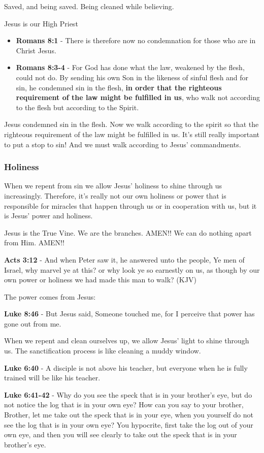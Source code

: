 \documentclass[11pt]{article}
\begin{document}
Saved, and being saved. Being cleaned while believing.

Jesus is our High Priest
\begin{itemize}
\item \textbf{Romans 8:1} - There is therefore now no condemnation for those who are in Christ Jesus.
\item \textbf{Romans 8:3-4} - For God has done what the law, weakened by the flesh, could not do. By sending his own Son in the likeness of sinful flesh and for sin, he condemned sin in the flesh, \textbf{in order that the righteous requirement of the law might be fulfilled in us}, who walk not according to the flesh but according to the Spirit.
\end{itemize}

Jesus condemned sin in the flesh. Now we walk according to the spirit so that the righteous requirement of the law might be fulfilled in us.
It's still really important to put a stop to sin! And we must walk according to Jesus' commandments.

\subsubsection{Holiness}
\label{sec:org4b4db7a}
When we repent from sin we allow Jesus' holiness to shine through us increasingly.
Therefore, it's really not our own holiness or power that is responsible for miracles that happen through us or in cooperation with us, but it is Jesus' power and holiness.

Jesus is the True Vine. We are the branches. AMEN!! We can do nothing apart from Him. AMEN!!

\textbf{Acts 3:12} - And when Peter saw it, he answered unto the people, Ye men of Israel, why marvel ye at this? or why look ye so earnestly on us, as though by our own power or holiness we had made this man to walk? (KJV)

The power comes from Jesus:

\textbf{Luke 8:46} - But Jesus said, Someone touched me, for I perceive that power has gone out from me.

When we repent and clean ourselves up, we allow Jesus' light to shine through us. The sanctification process is like cleaning a muddy window.

\textbf{Luke 6:40} - A disciple is not above his teacher, but everyone when he is fully trained will be like his teacher.

\textbf{Luke 6:41-42} - Why do you see the speck that is in your brother's eye, but do not notice the log that is in your own eye? How can you say to your brother, Brother, let me take out the speck that is in your eye, when you yourself do not see the log that is in your own eye? You hypocrite, first take the log out of your own eye, and then you will see clearly to take out the speck that is in your brother's eye.
\end{document}
